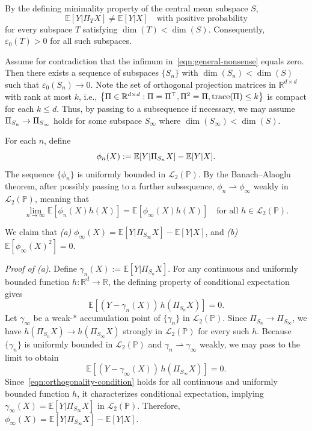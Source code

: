\documentclass[sn-mathphys-num]{sn-jnl}%
\numberwithin{equation}{section}
\newcommand{\R}{\mathbb{R}}
\newcommand{\E}{\mathbb{E}}
\theoremstyle{thmstyleone}%
\theoremstyle{thmstyletwo}%
\theoremstyle{thmstylethree}%
\begin{document}
By the defining minimality property of the central mean subspace $S$, \[
\E[Y | \Pi_T X] \neq \E[Y | X]
\quad \text{with positive probability}
\]
for every subspace $T$ satisfying $\dim(T) < \dim(S)$. Consequently,
$\varepsilon_0(T) > 0$ for all such subspaces.

Assume for contradiction that the infimum in~\eqref{eqn:general-nonsense} equals zero.
Then there exists a sequence of subspaces $\{S_n\}$ with $\dim(S_n) < \dim(S)$
such that $\varepsilon_0(S_n) \to 0$. 
Note the set of orthogonal projection matrices in $\mathbb{R}^{d\times d}$ with rank at most
$k$, i.e., 
$
	\left\{\Pi \in \R^{d\times d}: \Pi = \Pi^\top, \Pi^2 = \Pi, {\rm trace}(\Pi) \le k \right\}
$
is compact for each $k \le d$. Thus, by passing to a subsequence if necessary, we may assume
$\Pi_{S_n} \to \Pi_{S_\infty}$ holds for some 
subspace $S_\infty$ where $\dim(S_\infty) < \dim(S)$. 

For each $n$, define
\begin{equation*}
	\phi_n(X) :=  \E[Y|\proj_{S_n} X]- \E[Y|X]. 
\end{equation*}
The sequence $\{\phi_n\}$ is uniformly bounded in $\mathcal{L}_2(\mathbb{P})$. By the
Banach--Alaoglu theorem, after possibly passing to a further subsequence,
$\phi_n \rightharpoonup \phi_\infty$ weakly in $\mathcal{L}_2(\mathbb{P})$, meaning that
\[
\lim_{n\to\infty} \E[\phi_n(X) h(X)] = \E[\phi_\infty(X) h(X)]
\quad \text{for all } h \in \mathcal{L}_2(\mathbb{P}).
\]

We claim that \emph{(a)} $\phi_\infty(X) = \E[Y| \Pi_{S_\infty} X] - \E[Y | X]$, and  
\emph{(b)} $\E[\phi_\infty(X)^2] = 0$.

\emph{Proof of (a)}. 
Define $\gamma_n(X) := \E[Y | \Pi_{S_n} X]$. For any continuous and uniformly
bounded function $h : \mathbb{R}^d \to \mathbb{R}$, the defining property of
conditional expectation gives
\[
\E\!\left[(Y - \gamma_n(X))\, h(\Pi_{S_n} X)\right] = 0 .
\]
Let $\gamma_\infty$ be a weak-$*$ accumulation point of $\{\gamma_n\}$ in
$\mathcal{L}_2(\mathbb{P})$. Since $\Pi_{S_n} \to \Pi_{S_\infty}$, we have
$h(\Pi_{S_n} X) \to h(\Pi_{S_\infty} X)$ strongly in $\mathcal{L}_2(\mathbb{P})$
for every such $h$. Because $\{\gamma_n\}$ is uniformly bounded in
$\mathcal{L}_2(\mathbb{P})$ and $\gamma_n \rightharpoonup \gamma_\infty$ weakly,
we may pass to the limit to obtain
\begin{equation}
\label{eqn:orthogonality-condition}
\E\!\left[(Y - \gamma_\infty(X))\, h(\Pi_{S_\infty} X)\right] = 0 .
\end{equation}
Since~\eqref{eqn:orthogonality-condition} holds for all continuous and uniformly
bounded function $h$, it characterizes conditional expectation, implying
$\gamma_\infty(X) = \E[Y | \Pi_{S_\infty} X]$ in $\mathcal{L}_2(\mathbb{P})$.
Therefore,
$\phi_\infty(X) = \E[Y| \Pi_{S_\infty} X] - \E[Y | X]$.
\end{document}
